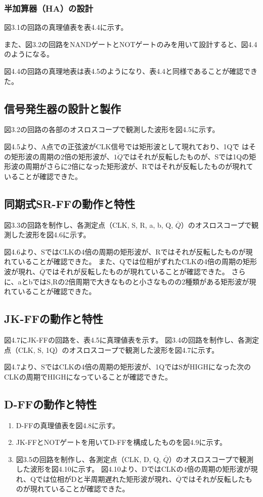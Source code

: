 \documentclass{jlreq}
\numberwithin{equation}{section}
\begin{document}
\subsubsection{半加算器（HA）の設計}
図3.1の回路の真理値表を表4.4に示す。

また、図3.2の回路をNANDゲートとNOTゲートのみを用いて設計すると、図4.4のようになる。

図4.4の回路の真理地表は表4.5のようになり、表4.4と同様であることが確認できた。

\subsection{信号発生器の設計と製作}
図3.2の回路の各部のオスロスコープで観測した波形を図4.5に示す。

図4.5より、A点での正弦波がCLK信号では矩形波として現れており、1Qで
はその矩形波の周期の2倍の矩形波が、\(\overline{1Q}\)ではそれが反転したものが、Sでは1Qの矩形波の周期がさらに2倍になった矩形波が、Rではそれが反転したものが現れていることが確認できた。

\subsection{同期式SR-FFの動作と特性}
図3.3の回路を制作し、各測定点（CLK, S, R, a, b, Q, \(\overline{Q}\)）のオスロスコープで観測した波形を図4.6に示す。

図4.6より、SではCLKの4倍の周期の矩形波が、Rではそれが反転したものが現れていることが確認できた。
また、Qでは位相がずれたCLKの4倍の周期の矩形波が現れ、\(\overline{Q}\)ではそれが反転したものが現れていることが確認できた。
さらに、aとbではS,Rの2倍周期で大きなものと小さなものの2種類がある矩形波が現れていることが確認できた。

\subsection{JK-FFの動作と特性}
図4.7にJK-FFの回路を、表4.5に真理値表を示す。
図3.4の回路を制作し、各測定点（CLK, S, 1Q）のオスロスコープで観測した波形を図4.7に示す。

図4.7より、SではCLKの4倍の周期の矩形波が、1QではSがHIGHになった次のCLKの周期でHIGHになっていることが確認できた。

\subsection{D-FFの動作と特性}
\begin{enumerate}
  \item D-FFの真理値表を図4.8に示す。
  \item JK-FFとNOTゲートを用いてD-FFを構成したものを図4.9に示す。
  \item 図3.5の回路を制作し、各測定点（CLK, D, Q, \(\overline{Q}\)）のオスロスコープで観測した波形を図4.10に示す。
  図4.10より、DではCLKの4倍の周期の矩形波が現れ、Qでは位相がDと半周期遅れた矩形波が現れ、\(\overline{Q}\)ではそれが反転したものが現れていることが確認できた。
\end{enumerate}
\end{document}
